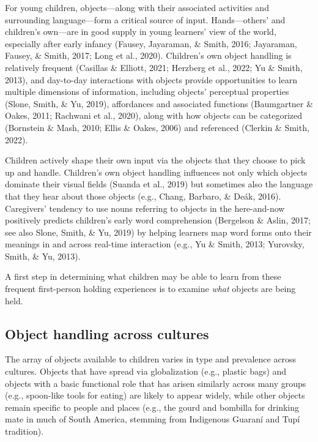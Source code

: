\documentclass[10pt, letterpaper]{article}
\begin{document}
For young children, objects---along with their associated activities and
surrounding language---form a critical source of input. Hands---others'
and children's own---are in good supply in young learners' view of the
world, especially after early infancy (Fausey, Jayaraman, \& Smith,
2016; Jayaraman, Fausey, \& Smith, 2017; Long et al., 2020). Children's
own object handling is relatively frequent (Casillas \& Elliott, 2021;
Herzberg et al., 2022; Yu \& Smith, 2013), and day-to-day interactions
with objects provide opportunities to learn multiple dimensions of
information, including objects' perceptual properties (Slone, Smith, \&
Yu, 2019), affordances and associated functions (Baumgartner \& Oakes,
2011; Rachwani et al., 2020), along with how objects can be categorized
(Bornstein \& Mash, 2010; Ellis \& Oakes, 2006) and referenced (Clerkin
\& Smith, 2022).

Children actively shape their own input via the objects that they choose
to pick up and handle. Children's own object handling influences not
only which objects dominate their visual fields (Suanda et al., 2019)
but sometimes also the language that they hear about those objects
(e.g., Chang, Barbaro, \& Deák, 2016). Caregivers' tendency to use nouns
referring to objects in the here-and-now positively predicts children's
early word comprehension (Bergelson \& Aslin, 2017; see also Slone,
Smith, \& Yu, 2019) by helping learners map word forms onto their
meanings in and across real-time interaction (e.g., Yu \& Smith, 2013;
Yurovsky, Smith, \& Yu, 2013).

A first step in determining what children may be able to learn from
these frequent first-person holding experiences is to examine
\emph{what} objects are being held.

\hypertarget{object-handling-across-cultures}{%
\subsection{Object handling across
cultures}\label{object-handling-across-cultures}}

The array of objects available to children varies in type and prevalence
across cultures. Objects that have spread via globalization (e.g.,
plastic bags) and objects with a basic functional role that has arisen
similarly across many groups (e.g., spoon-like tools for eating) are
likely to appear widely, while other objects remain specific to people
and places (e.g., the gourd and bombilla for drinking mate in much of
South America, stemming from Indigenous Guaraní and Tupí tradition).
\end{document}
